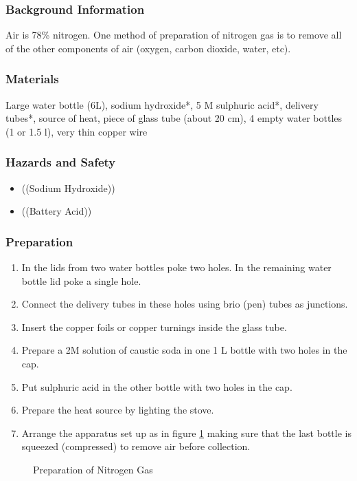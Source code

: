 \subsubsection*{Background Information}
Air is 78\% nitrogen. One method of preparation of nitrogen gas is to remove all of the other components of air (oxygen, carbon dioxide, water, etc).

\subsubsection*{Materials}
Large water bottle (6L), sodium hydroxide*, 5 M sulphuric acid*, delivery tubes*, source of heat, piece of glass tube (about 20 cm), 4 empty water bottles (1 or 1.5 l), very thin copper wire

\subsubsection*{Hazards and Safety}
\begin{itemize}
\item{((Sodium Hydroxide))}
\item{((Battery Acid))}
\end{itemize}

\subsubsection*{Preparation}
\begin{enumerate}
\item{In the lids from two water bottles poke two holes. In the remaining water bottle lid poke a single hole.}
\item{Connect the delivery tubes in these holes using brio (pen) tubes as junctions.}
\item{Insert the copper foils or copper turnings inside the glass tube.}
\item{Prepare a 2M solution of caustic soda in one 1 L bottle with two holes in the cap.}
\item{Put sulphuric acid in the other bottle with two holes in the cap.}
\item{Prepare the heat source by lighting the stove.}
\item{Arrange the apparatus set up as in figure \ref{fig:nitrogen-prep} making sure that the last bottle is squeezed (compressed) to remove air before collection.}
\end{enumerate}

\begin{figure}[h]
\begin{center}
\def\svgwidth{400pt}

\caption{Preparation of Nitrogen Gas}
\label{fig:nitrogen-prep}
\end{center}
\end{figure}

